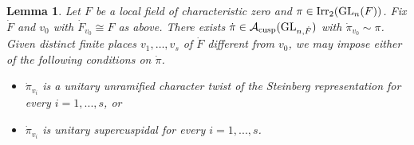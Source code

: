 \documentclass[11pt,reqno]{amsart}
\theoremstyle{plain}
\newtheorem{lem}[thm]{Lemma}
\theoremstyle{definition}
\newcommand{\cA}{\mathcal{A}}
\newcommand{\cusp}{\tu{cusp}}
\newcommand{\GL}{\tu{GL}}
\newcommand{\Irr}{\tu{Irr}}
\newcommand{\tu}{\textup}
\numberwithin{equation}{subsection}
\begin{document}
\begin{lem}\label{lem:globalization-rep}
Let $F$ be a local field of characteristic zero and
$\pi\in\Irr_2(\GL_n(F))$. Fix $\dot F$ and $v_0$ with $\dot F_{v_0}\cong F$ as above. There exists
$\dot\pi\in\cA_{\cusp}(\GL_{n,\dot F})$ with $\dot\pi_{v_0}\sim\pi$.
Given distinct finite places $v_1,\dots,v_s$ of $\dot F$ different from
$v_0$, we may impose either of the following conditions on $\dot\pi$.
\begin{itemize}
    \item[(i)] $\dot\pi_{v_i}$ is a unitary unramified character twist of the Steinberg representation for every $i=1,...,s$, or
    \item[(ii)] $\dot\pi_{v_i}$ is unitary supercuspidal for every $i=1,...,s$.
\end{itemize}
\end{lem}
\end{document}
